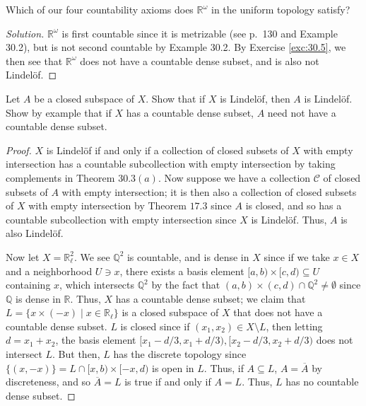 \documentclass[12pt]{article}
\theoremstyle{remark}
\begin{document}
\setcounter{subsubsection}{7}
\begin{problem}
  Which of our four countability axioms does $\mathbb{R}^\omega$ in the uniform topology satisfy?
\end{problem}
\begin{proof}[Solution]
  $\mathbb{R}^\omega$ is first countable since it is metrizable (see p.~130 and
  Example 30.2), but is not second countable by Example 30.2. By Exercise
  \ref{exc:30.5}, we then see that $\mathbb{R}^\omega$ does not have a countable dense subset, and is also not Lindel\"of.
\end{proof}

\begin{problem}
  Let $A$ be a closed subspace of $X$. Show that if $X$ is Lindel\"of, then $A$ is Lindel\"of. Show by example that if $X$ has a countable dense subset, $A$ need not have a countable dense subset.
\end{problem}
\begin{proof}
  $X$ is Lindel\"of if and only if a collection of closed subsets of $X$ with empty intersection has a countable subcollection with empty intersection by taking complements in Theorem $30.3(a)$. Now suppose we have a collection $\mathcal{C}$ of closed subsets of $A$ with empty intersection; it is then also a collection of closed subsets of $X$ with empty intersection by Theorem $17.3$ since $A$ is closed, and so has a countable subcollection with empty intersection since $X$ is Lindel\"of. Thus, $A$ is also Lindel\"of.
  \par Now let $X = \mathbb{R}_\ell^2$. We see $\mathbb{Q}^2$ is countable, and is dense in $X$ since if we take $x \in X$ and a neighborhood $U \ni x$, there exists a basis element $[a,b) \times [c,d) \subseteq U$ containing $x$, which intersects $\mathbb{Q}^2$ by the fact that $(a,b) \times (c,d) \cap \mathbb{Q}^2 \ne \emptyset$ since $\mathbb{Q}$ is dense in $\mathbb{R}$. Thus, $X$ has a countable dense subset; we claim that $L = \{x \times (-x) \mid x \in \mathbb{R}_\ell\}$ is a closed subspace of $X$ that does not have a countable dense subset. $L$ is closed since if $(x_1,x_2) \in X \setminus L$, then letting $d = x_1+x_2$, the basis element $[x_1-d/3,x_1+d/3),[x_2-d/3,x_2+d/3)$ does not intersect $L$. But then, $L$ has the discrete topology since $\{(x,-x)\} = L \cap [x,b) \times [-x,d)$ is open in $L$. Thus, if $A \subseteq L$, $A = \overline{A}$ by discreteness, and so $\overline{A} = L$ is true if and only if $A = L$. Thus, $L$ has no countable dense subset.
\end{proof}
\end{document}
